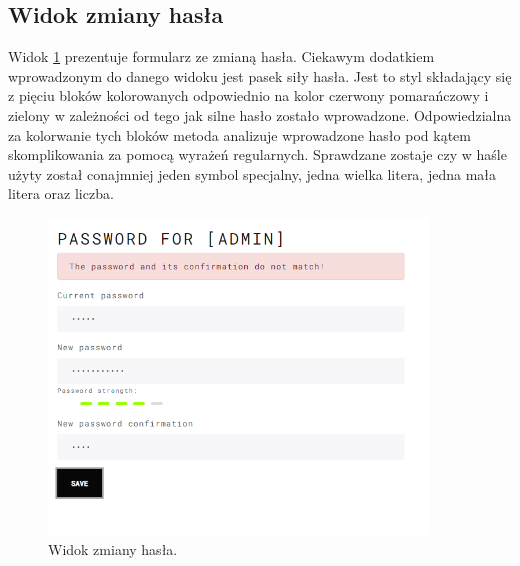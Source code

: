 \subsection{Widok zmiany hasła}
Widok \ref{change-pass} prezentuje formularz ze zmianą hasła. Ciekawym dodatkiem wprowadzonym do danego widoku jest pasek siły hasła. Jest to styl składający się z pięciu bloków kolorowanych odpowiednio na kolor czerwony pomarańczowy i zielony w zależności od tego jak silne hasło zostało wprowadzone. Odpowiedzialna za kolorwanie tych bloków metoda analizuje wprowadzone hasło pod kątem skomplikowania za pomocą wyrażeń regularnych.
Sprawdzane zostaje czy w haśle użyty został conajmniej jeden symbol specjalny, jedna wielka litera, jedna mała litera oraz liczba.
\begin{figure}[h!]
	\centering
	\includegraphics[width=0.90\textwidth]{change-pass}
	
	\caption{Widok zmiany hasła.}
	\label{change-pass}
\end{figure}
\clearpage

